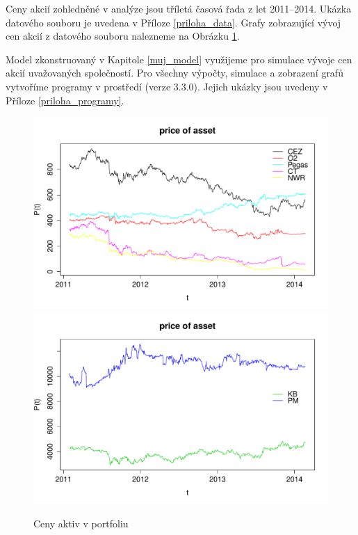 \documentclass[a4paper,12pt]{report}
\makeatletter
\theoremstyle{definition} \newtheorem{definice}[veta]{Definice}
\theoremstyle{remark}
\def\R{\scalebox{\f@size}{\usebox\rbox}\xspace}
\makeatother
\begin{document}
Ceny akcií zohledněné v analýze jsou tříletá časová řada z let 2011--2014. %
Ukázka datového souboru je uvedena v Příloze \ref{priloha_data}.
Grafy zobrazující vývoj cen akcií z datového souboru nalezneme na Obrázku \ref{model_price_of_asset}.

Model zkonstruovaný v Kapitole \ref{muj_model} využijeme pro simulace vývoje cen akcií uvažovaných společností.
Pro všechny výpočty, simulace a zobrazení grafů vytvoříme programy v prostředí \R (verze 3.3.0).
Jejich ukázky jsou uvedeny v Příloze \ref{priloha_programy}.

\begin{figure}[!htbp]
  \centering 
	\includegraphics[width=13.5cm, clip, trim= 0 15 25 50]{IMG/data_price_of_asset_ostatni.pdf}\\[5mm]
	\includegraphics[width=13.5cm, clip, trim= 0 15 25 50]{IMG/data_price_of_asset_KBPM_v2.pdf}	
  \caption{Ceny aktiv v portfoliu}  \label{model_price_of_asset}
\end{figure}
\end{document}
